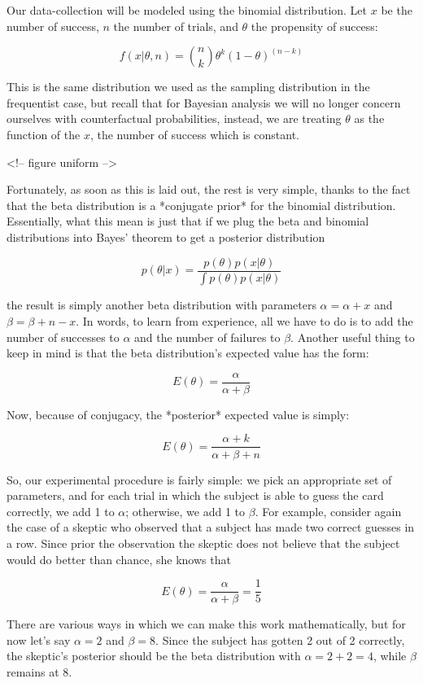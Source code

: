 Our data-collection will be modeled using the binomial distribution. Let
\(x\) be the number of success, \(n\) the number of trials, and
\(\theta\) the propensity of success:

\[f(x|\theta, n) = {n\choose k} \theta^k (1-\theta)^{(n-k)}\]

This is the same distribution we used as the sampling distribution in
the frequentist case, but recall that for Bayesian analysis we will no
longer concern ourselves with counterfactual probabilities, instead, we
are treating \(\theta\) as the function of the \(x\), the number of
success which is constant.

\textless{}!-- figure uniform --\textgreater{}

Fortunately, as soon as this is laid out, the rest is very simple,
thanks to the fact that the beta distribution is a *conjugate prior* for
the binomial distribution. Essentially, what this mean is just that if
we plug the beta and binomial distributions into Bayes' theorem to get a
posterior distribution

\[p(\theta|x) = \frac{p(\theta)p(x|\theta)}{\int p(\theta)p(x|\theta)}\]

the result is simply another beta distribution with parameters
\(\alpha =\alpha + x\) and \(\beta = \beta + n - x\). In words, to learn
from experience, all we have to do is to add the number of successes to
\(\alpha\) and the number of failures to \(\beta\). Another useful thing
to keep in mind is that the beta distribution's expected value has the
form:

\[E(\theta) = \frac{\alpha}{\alpha + \beta}\]

Now, because of conjugacy, the *posterior* expected value is simply:

\[E(\theta) = \frac{\alpha + k}{\alpha + \beta + n}\]

So, our experimental procedure is fairly simple: we pick an appropriate
set of parameters, and for each trial in which the subject is able to
guess the card correctly, we add 1 to \(\alpha\); otherwise, we add 1 to
\(\beta\). For example, consider again the case of a skeptic who
observed that a subject has made two correct guesses in a row. Since
prior the observation the skeptic does not believe that the subject
would do better than chance, she knows that

\[E(\theta) = \frac{\alpha}{\alpha + \beta} = \frac{1}{5}\]

There are various ways in which we can make this work mathematically,
but for now let's say \(\alpha = 2\) and \(\beta = 8\). Since the
subject has gotten 2 out of 2 correctly, the skeptic's posterior should
be the beta distribution with \(\alpha= 2+2=4\), while \(\beta\) remains
at 8.

